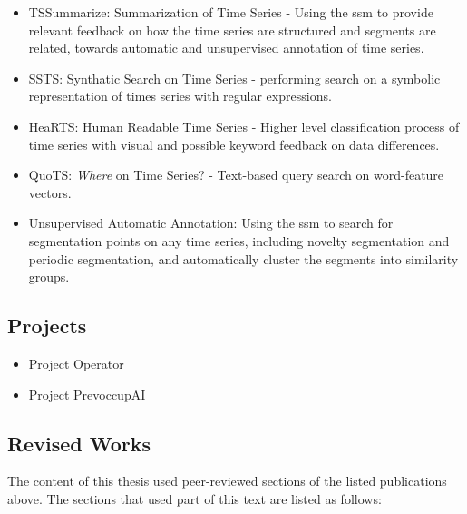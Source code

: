 \begin{itemize}


\item TSSummarize: Summarization of Time Series - Using the \gls{ssm} to provide relevant feedback on how the time series are structured and segments are related, towards automatic and unsupervised annotation of time series.

\item SSTS: Synthatic Search on Time Series - performing search on a symbolic representation of times series with regular expressions.

\item HeaRTS: Human Readable Time Series - Higher level classification process of time series with visual and possible keyword feedback on data differences.

\item QuoTS: \textit{Where} on Time Series? - Text-based query search on word-feature vectors. 

\item Unsupervised Automatic Annotation: Using the \gls{ssm} to search for segmentation points on any time series, including novelty segmentation and periodic segmentation, and automatically cluster the segments into similarity groups.

\end{itemize}

\subsection{Projects}

\begin{itemize}
\item Project Operator
\item Project PrevoccupAI
\end{itemize}

\subsection{Revised Works}

The content of this thesis used peer-reviewed sections of the listed publications above. The sections that used part of this text are listed as follows:

